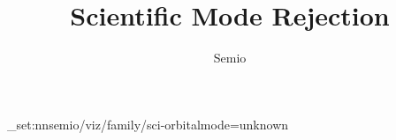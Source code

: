 \documentclass[type=paper,language=en,theme=light]{semio}
\title{Scientific Mode Rejection}
\author{Semio}
\date{}
\begin{document}
\SemioVizProbePage
\ExplSyntaxOn\keys_set:nn{semio/viz/family/sci-orbital}{mode=unknown}\ExplSyntaxOff
{}
\SemioVizProbeEnd
\end{document}
